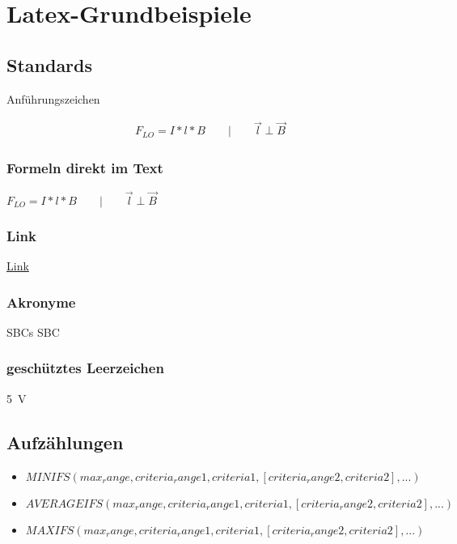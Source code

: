 \chapter{Latex-Grundbeispiele}\label{sec:neues_kapitel}

\section{Standards}
\glqq Anführungszeichen\grqq{}                          %

\begin{align}                                   %
    F_{LO} = I*l*B \qquad | \qquad \vec{l}  \perp \vec{B} \label{formel:lorentz}
\end{align}

\subsection{Formeln direkt im Text}
$F_{LO} = I*l*B \qquad | \qquad \vec{l}\perp \vec{B}$            %

\subsection{Link}
\href{https://www.dsl-ltd.co.uk/what-are-single-board-computers-and-how-are-they-used/}{Link}


\subsection{Akronyme}
\acp{SBC}
\acf{SBC}
\subsection*{geschütztes Leerzeichen}
5~V

\section{Aufzählungen}

\begin{itemize}                                         %
        \item $MINIFS(max_range, criteria_range1, criteria1, [criteria_range2, criteria2], ...)$
        \item $AVERAGEIFS(max_range, criteria_range1, criteria1, [criteria_range2, criteria2], ...)$
        \item $MAXIFS(max_range, criteria_range1, criteria1, [criteria_range2, criteria2], ...)$\cite{SBCs,fritzing}
\end{itemize}

